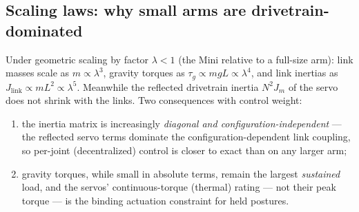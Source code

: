 \documentclass[conference]{IEEEtran}
\begin{document}
\subsection{Scaling laws: why small arms are drivetrain-dominated}
Under geometric scaling by factor $\lambda < 1$ (the Mini relative to a full-size arm): link masses scale as $m \propto \lambda^3$, gravity torques as $\tau_g \propto m g L \propto \lambda^4$, and link inertias as $J_{\mathrm{link}} \propto m L^2 \propto \lambda^5$. Meanwhile the reflected drivetrain inertia $N^2 J_m$ of the servo does not shrink with the links. Two consequences with control weight:
\begin{enumerate}[label=(\alph*)]
\item the inertia matrix is increasingly \emph{diagonal and configuration-independent} --- the reflected servo terms dominate the configuration-dependent link coupling, so per-joint (decentralized) control is closer to exact than on any larger arm;
\item gravity torques, while small in absolute terms, remain the largest \emph{sustained} load, and the servos' continuous-torque (thermal) rating --- not their peak torque --- is the binding actuation constraint for held postures.
\end{enumerate}
\end{document}
